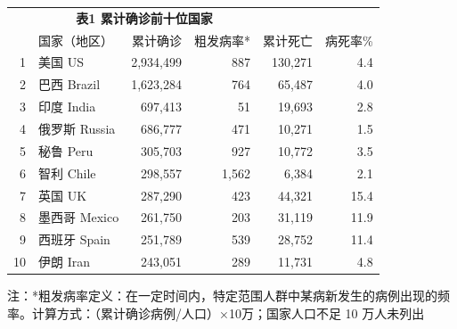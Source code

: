 \documentclass[]{article}
\begin{document}
\begin{table}[H]
    \centering \begin{table}[H]
\centering\begingroup\fontsize{14}{16}\selectfont

\begin{tabular}{rlrrrr}
\toprule
\multicolumn{0}{c}{\textbf{ }} & \multicolumn{3}{c}{\textbf{表1 累计确诊前十位国家}} \\
  & 国家（地区） & 累计确诊 & 粗发病率* & 累计死亡 & 病死率\%\\
\midrule
\rowcolor{gray!6}  1 & 美国 US & 2,934,499 & 887 & 130,271 & 4.4\\
2 & 巴西 Brazil & 1,623,284 & 764 & 65,487 & 4.0\\
\rowcolor{gray!6}  3 & 印度 India & 697,413 & 51 & 19,693 & 2.8\\
4 & 俄罗斯 Russia & 686,777 & 471 & 10,271 & 1.5\\
\rowcolor{gray!6}  5 & 秘鲁 Peru & 305,703 & 927 & 10,772 & 3.5\\
6 & 智利 Chile & 298,557 & 1,562 & 6,384 & 2.1\\
\rowcolor{gray!6}  7 & 英国 UK & 287,290 & 423 & 44,321 & 15.4\\
8 & 墨西哥 Mexico & 261,750 & 203 & 31,119 & 11.9\\
\rowcolor{gray!6}  9 & 西班牙 Spain & 251,789 & 539 & 28,752 & 11.4\\
10 & 伊朗 Iran & 243,051 & 289 & 11,731 & 4.8\\
\bottomrule
\end{tabular}
\endgroup{}
\end{table} \begin{tablenotes}
        \fontsize{15}{15}
        \selectfont
        \item 注：*粗发病率定义：在一定时间内，特定范围人群中某病新发生的病例出现的频率。计算方式：（累计确诊病例/人口）×10万；国家人口不足 10 万人未列出 %
      \end{tablenotes}
\end{table}
\end{document}
